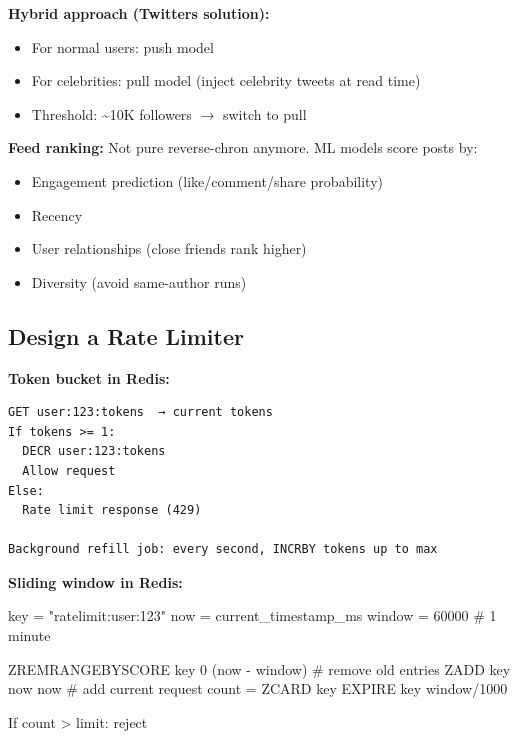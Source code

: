 \documentclass[11pt]{article}
\providecommand{\tightlist}{\setlength{\itemsep}{1pt}\setlength{\parskip}{0pt}}
\newenvironment{Shaded}{\begin{snugshade}}{\end{snugshade}}
\newcommand{\CommentTok}[1]{\textcolor[rgb]{0.48,0.49,0.49}{#1}}
\newcommand{\DecValTok}[1]{\textcolor[rgb]{0.96,0.45,0.00}{#1}}
\newcommand{\NormalTok}[1]{\textcolor[rgb]{0.81,0.81,0.76}{#1}}
\newcommand{\OperatorTok}[1]{\textcolor[rgb]{0.81,0.81,0.76}{#1}}
\newcommand{\StringTok}[1]{\textcolor[rgb]{0.96,0.31,0.31}{#1}}
\begin{document}
\textbf{Hybrid approach (Twitter\textquotesingle s solution):}

\begin{itemize}
\tightlist
\item
  For normal users: push model
\item
  For celebrities: pull model (inject celebrity tweets at read time)
\item
  Threshold: \textasciitilde10K followers \(\rightarrow\) switch to pull
\end{itemize}

\textbf{Feed ranking:} Not pure reverse-chron anymore. ML models score posts by:

\begin{itemize}
\tightlist
\item
  Engagement prediction (like/comment/share probability)
\item
  Recency
\item
  User relationships (close friends rank higher)
\item
  Diversity (avoid same-author runs)
\end{itemize}

\subsection{Design a Rate Limiter}\label{design-a-rate-limiter}

\textbf{Token bucket in Redis:}

\setcodelang{}

\begin{verbatim}
GET user:123:tokens  → current tokens
If tokens >= 1:
  DECR user:123:tokens
  Allow request
Else:
  Rate limit response (429)

Background refill job: every second, INCRBY tokens up to max
\end{verbatim}

\textbf{Sliding window in Redis:}


\begin{Shaded}
\begin{Highlighting}[]
\NormalTok{key }\OperatorTok{=} \StringTok{"ratelimit:user:123"}
\NormalTok{now }\OperatorTok{=}\NormalTok{ current\_timestamp\_ms}
\NormalTok{window }\OperatorTok{=} \DecValTok{60000}  \CommentTok{\# 1 minute}

\NormalTok{ZREMRANGEBYSCORE key }\DecValTok{0}\NormalTok{ (now }\OperatorTok{{-}}\NormalTok{ window)     }\CommentTok{\# remove old entries}
\NormalTok{ZADD key now now                           }\CommentTok{\# add current request}
\NormalTok{count }\OperatorTok{=}\NormalTok{ ZCARD key}
\NormalTok{EXPIRE key window}\OperatorTok{/}\DecValTok{1000}

\NormalTok{If count }\OperatorTok{\textgreater{}}\NormalTok{ limit: reject}
\end{Highlighting}
\end{Shaded}
\end{document}
